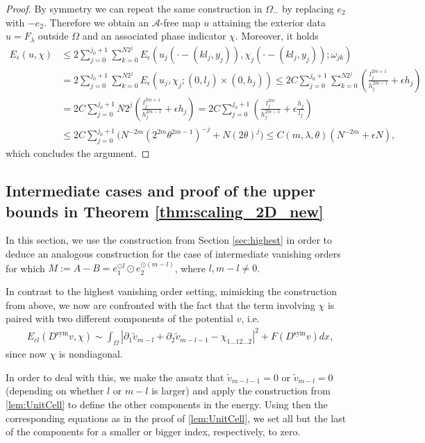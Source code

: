 \documentclass[a4paper, 10pt, twoside, notitlepage]{amsart}
\theoremstyle{plain}
\newcommand{\p}{\partial}
\newcommand{\A}{\mathcal{A}}
\newcommand{\Ds}{D^{\text{sym}}}
\begin{document}
\begin{proof}
			By symmetry we can repeat the same construction in $\Omega_-$ by replacing $e_2$ with $-e_2$. Therefore we obtain an $\A$-free map $u$ attaining the exterior data $u = F_\lambda$ outside
			$\Omega$ and an associated phase indicator $\chi$.  Moreover, it holds
			\begin{align*}
				E_{\epsilon}(u,\chi) & \leq 2 \sum_{j=0}^{j_0+1} \sum_{k=0}^{N 2^j} E_\epsilon(u_{j}(\cdot - (kl_j,y_j)),\chi_j( \cdot - (kl_j,y_j)); \omega_{jk}) \\
				& = 2 \sum_{j=0}^{j_0+1} \sum_{k=0}^{N 2^j} E_\epsilon(u_j,\chi_j;(0,l_j)\times(0,h_j)) \leq 2 C \sum_{j=0}^{j_0+1} \sum_{k=0}^{N 2^j} (\frac{l_j^{2m+1}}{h_j^{2m-1}} + \epsilon h_j) \\
				& = 2 C \sum_{j=0}^{j_0+1} N 2^j (\frac{l_j^{2m+1}}{h_j^{2m-1}} + \epsilon h_j) = 2 C \sum_{j=0}^{j_0+1} (\frac{l_j^{2m}}{h_j^{2m-1}} + \epsilon \frac{h_j}{l_j}) \\
				& \leq 2 C \sum_{j=0}^{j_0+1} \Big(N^{-2m} (2^{2m} \theta^{2m-1})^{-j} + N (2\theta)^j \Big) \leq C(m,\lambda,\theta)(N^{-2m} + \epsilon N),
			\end{align*}
			which concludes the argument.
		\end{proof}
		
		\subsection{Intermediate cases and proof of the upper bounds in Theorem \ref{thm:scaling_2D_new}}
		
		In this section, we use the construction from Section \ref{sec:highest} in order to deduce an analogous construction for the case of intermediate vanishing orders for which $M:=A-B = e_1^{\odot l} \odot e_2^{\odot (m-l)}$,
		where $l,m-l \neq 0$.
		
		
		In contrast to the highest vanishing order setting, mimicking the construction from above, we now are confronted with the fact that the term involving $\chi$ is paired with two different components of the potential $v$, i.e.
		\begin{align*}
			E_{el}(\Ds v,\chi) \sim \int_\Omega |\p_1 \tilde{v}_{m-l} + \p_2 \tilde{v}_{m-l-1} - \chi_{1\dots12\dots2}|^2 + F(\Ds v) dx,
		\end{align*}
		since now $\chi$ is nondiagonal.
		
		In order to deal with this, we make the ansatz that $\tilde{v}_{m-l-1} = 0$ or $\tilde{v}_{m-l}=0$ (depending on whether $l$ or $m-l$ is larger)  and apply the construction from \cref{lem:UnitCell} to define the other components in the energy.
		Using then the corresponding equations as in the proof of \cref{lem:UnitCell}, we set all but the last of the components for a smaller or bigger index, respectively, to zero.
		
\end{document}
